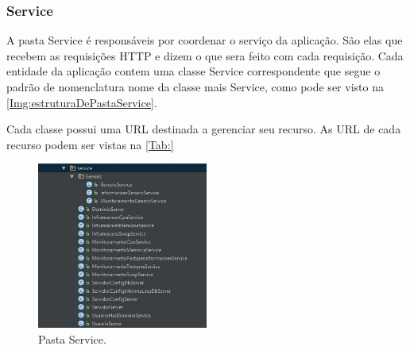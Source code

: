 \subsubsection{Service}\label{subsubsec:Service}

A pasta Service é responsáveis por coordenar o serviço da aplicação. São elas que recebem as requisições HTTP e dizem o que sera feito com cada requisição. Cada entidade da aplicação contem uma classe Service correspondente que segue o padrão de nomenclatura nome da classe mais Service, como pode ser visto na \autoref{Img:estruturaDePastaService}. 

Cada classe possui uma URL destinada a gerenciar seu recurso. As URL de cada recurso podem ser vistas na \autoref{Tab:}

\begin{figure}[H]
	\centering
	\includegraphics[width=0.5\textwidth]{figuras/estruturaPojetoService.JPG}
	\caption[Pasta Service.]{Pasta Service.}
	\label{Img:estruturaDePastaService}
\end{figure}

